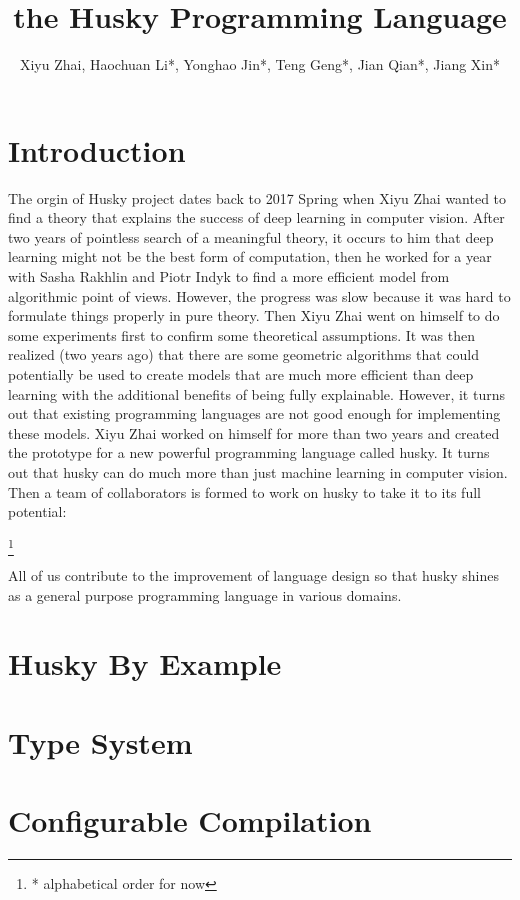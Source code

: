 \documentclass[11pt, oneside]{article}   	%
\title{the Husky Programming Language}
\author{Xiyu Zhai, Haochuan Li*, Yonghao Jin*, Teng Geng*, Jian Qian*, Jiang Xin*}
\date{}							%
\theoremstyle{definition}
\begin{document}
\maketitle
\tableofcontents
\abstract {}

\section{Introduction}

The orgin of Husky project dates back to 2017 Spring when Xiyu Zhai wanted to find a theory that explains the success of deep learning in computer vision. After two years of pointless search of a meaningful theory, it occurs to him that deep learning might not be the best form of computation, then he worked for a year with Sasha Rakhlin and Piotr Indyk to find a more efficient model from algorithmic point of views. However, the progress was slow because it was hard to formulate things properly in pure theory. Then Xiyu Zhai went on himself to do some experiments first to confirm some theoretical assumptions. It was then realized (two years ago) that there are some geometric algorithms that could potentially be used to create models that are much more efficient than deep learning with the additional benefits of being fully explainable. However, it turns out that existing programming languages are not good enough for implementing these models. Xiyu Zhai worked on himself for more than two years and created the prototype for a new powerful programming language called husky. It turns out that husky can do much more than just machine learning in computer vision. Then a team of collaborators is formed to work on husky to take it to its full potential:

\footnote[1] {* alphabetical order for now}

All of us contribute to the improvement of language design so that husky shines as a general purpose programming language in various domains.

\section{Husky By Example}

\section{Type System}

\section{Configurable Compilation}
\end{document}

